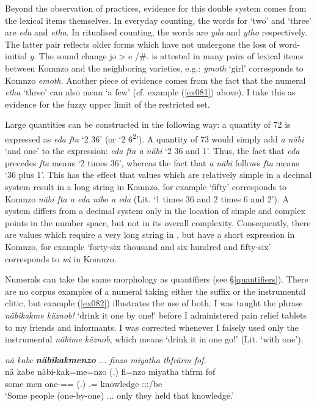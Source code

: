 Beyond the observation of practices, evidence for this double system comes from the lexical items themselves. In everyday counting, the words for `two' and `three' are \emph{eda} and \emph{etha}. In ritualised counting, the words are \emph{yda} and \emph{ytho} respectively. The latter pair reflects older forms which have not undergone the loss of word-initial \emph{y}. The sound change jə > e /\#. is attested in many pairs of lexical items between Komnzo and the neighboring  varieties, e.g.:  \emph{ymoth} `girl' corresponds to Komnzo \emph{emoth}. Another piece of evidence comes from the fact that the numeral \emph{etha} `three' can also mean `a few' (cf. example (\ref{ex081}) above). I take this as evidence for the fuzzy upper limit of the restricted set.%

Large quantities can be constructed in the following way: a quantity of 72 is expressed as \emph{eda fta} `2 36' (or `2 6\textsuperscript{2}'). A quantity of 73 would simply add \emph{a näbi} `and one' to the expression: \emph{eda fta a näbi} `2 36 and 1'. Thus, the fact that \emph{eda} precedes \emph{fta} means `2 times 36', whereas the fact that \emph{a näbi} follows \emph{fta} means `36 plus 1'. This has the effect that values which are relatively simple in a decimal system result in a long string in Komnzo, for example  `fifty' corresponds to Komnzo \emph{näbi fta a eda nibo a eda} (Lit. `1 times 36 and 2 times 6 and 2'). A  system differs from a decimal system only in the location of simple and complex points in the number space, but not in its overall complexity. Consequently, there are values which require a very long string in , but have a short expression in Komnzo, for example `forty-six thousand and six hundred and fifty-six' corresponds to \emph{wi} in Komnzo.%

Numerals can take the same morphology as quantifiers (see \S{}\ref{quantifiers}). There are no corpus examples of a numeral taking either the  suffix or the instrumental  clitic, but example (\ref{ex082}) illustrates the use of both. I was taught the phrase \emph{näbikakme käznob!} `drink it one by one!' before I administered pain relief tablets to my friends and informants. I was corrected whenever I falsely used only the instrumental \emph{näbime käznob}, which means `drink it in one go!' (Lit. `with one').

\begin{exe}
	\ex \emph{nä kabe \textbf{näbikakmenzo} ... finzo miyatha thfrärm fof.}\\
	\gll nä kabe näbi-kak=me=nzo (.) fi=nzo miyatha thfrm fof\\
	some men one-\Distr{}=\Ins{}=\Only{} (.) \Third.\Abs{}=\Only{} knowledge \Stpl{}:\Sbj:\Pst{}:\Dur{}/be \Emph{}\\
	\trans `Some people (one-by-one) ... only they held that knowledge.'\\ 
	\label{ex082}
\end{exe}

